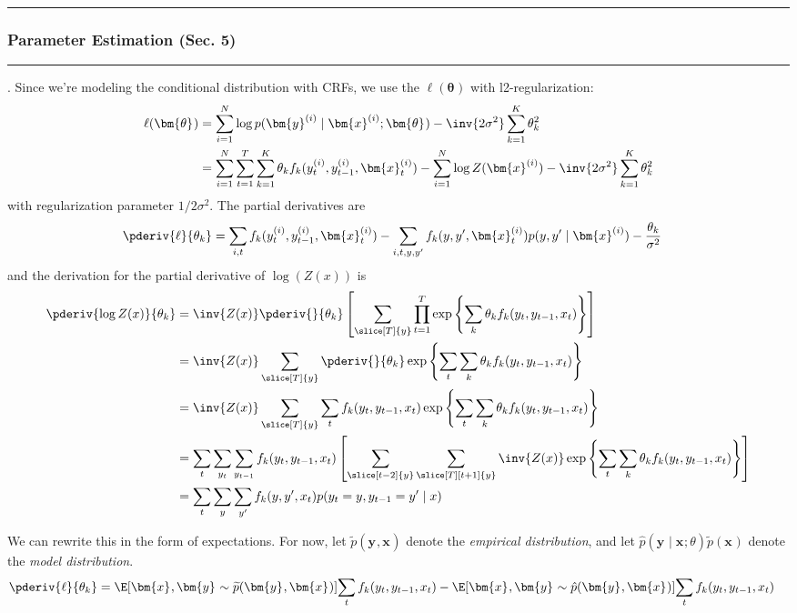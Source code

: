 \documentclass[11pt]{article}
\renewcommand\vec[2][]{\bm{#2}_{#1}}
\newcommand\myspace[1][]{\vspace{#1\bigskipamount}}
\newcommand\p{\Needspace{10\baselineskip} \noindent}
\newcommand\subsub[1]{\Needspace{15\baselineskip}\hrule\subsubsection{#1}\hrule}
\begin{document}
\myspace{}
\subsub{Parameter Estimation (Sec. 5)}
\myspace

\p {}. Since we're modeling the conditional distribution with CRFs, we use the  $\ell(\vec{\theta})$ with l2-regularization:
\begin{align}
	\ell(\vec{\theta}) &= \sum_{i = 1}^{N} \log p(\vec{y}^{(i)} \mid \vec{x}^{(i)} ; \vec{\theta}) - \inv{2\sigma^2}\sum_{k = 1}^{K} \theta_k^2 \\
	&= \sum_{i = 1}^{N}\sum_{t = 1}^{T}\sum_{k = 1}^{K} \theta_k f_k(y_t^{(i)}, y_{t-1}^{(i)}, \vec[t]{x}^{(i)}) - \sum_{i = 1}^{N} \log Z(\vec{x}^{(i)})  - \inv{2\sigma^2}\sum_{k = 1}^{K} \theta_k^2
\end{align}
with regularization parameter $1/2\sigma^2$. The partial derivatives are 
\begin{align}
	\pderiv{\ell}{\theta_k} &= \sum_{i,t} f_k(y_t^{(i)}, y_{t-1}^{(i)}, \vec[t]{x}^{(i)})
		- \sum_{i,t,y,y'} f_k(y, y', \vec[t]{x}^{(i)}) p(y, y' \mid \vec{x}^{(i)})
		- \frac{\theta_k}{\sigma^2}
\end{align}
and the derivation for the partial derivative of $\log(Z(x))$ is
\begin{align}
	\pderiv{\log Z(x)}{\theta_k} 
	&= \inv{Z(x)} \pderiv{}{\theta_k} \left[ \sum_{\slice[T]{y}} \prod_{t = 1}^{T} \exp\left\{ \sum_k \theta_k f_k(y_t, y_{t-1}, x_t)  \right\}  \right] 
	\\
	&= \inv{Z(x)} \sum_{\slice[T]{y}} \pderiv{}{\theta_k}  \exp\left\{ \sum_t \sum_k \theta_k f_k(y_t, y_{t-1}, x_t)  \right\}
	\\
	&= \inv{Z(x)} \sum_{\slice[T]{y}} \sum_t f_k(y_t, y_{t-1}, x_t)  \exp\left\{ \sum_t \sum_k \theta_k f_k(y_t, y_{t-1}, x_t)  \right\}  
	\\
	&= \sum_t \sum_{y_t} \sum_{y_{t-1}} f_k(y_t, y_{t-1}, x_t) \left[ \sum_{\slice[t-2]{y}} \sum_{\slice[T][t+1]{y}} \inv{Z(x)}  \exp\left\{ \sum_t \sum_k \theta_k f_k(y_t, y_{t-1}, x_t)  \right\}  \right] 
	\\
	&= \sum_t \sum_{y} \sum_{y'} f_k(y, y', x_t) p(y_t=y, y_{t-1}=y' \mid x)
\end{align}

We can rewrite this in the form of expectations. For now, let $\widetilde{p}(\vec y, \vec x)$ denote the \textit{empirical distribution}, and let $\hat{p}(\vec y \mid \vec x; \theta)\widetilde{p}(\vec x)$ denote the \textit{model distribution}.
\begin{align}
	\pderiv{\ell}{\theta_k}
		&= \E[\vec{x},\vec{y} \sim \widetilde{p}(\vec{y},\vec{x})]{\sum_t f_k(y_t, y_{t-1}, x_t)}
			- \E[\vec{x}, \vec y \sim \hat{p}(\vec y, \vec x)]{\sum_t f_k(y_t, y_{t-1}, x_t)}
\end{align}
\end{document}
